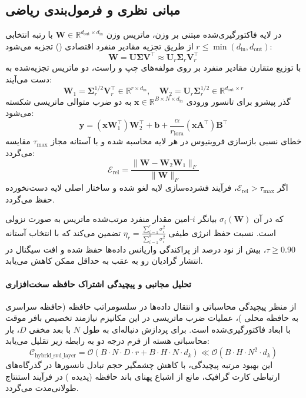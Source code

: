 \subsection{مبانی نظری و فرمول‌بندی ریاضی}
در لایه فاکتورگیری‌شده مبتنی بر وزن، ماتریس وزن $\mathbf{W} \in \mathbb{R}^{d_{\text{out}} \times d_{\text{in}}}$ با رتبه انتخابی $r \le \min(d_{\text{in}}, d_{\text{out}})$ از طریق تجزیه مقادیر منفرد اقتصادی () تجزیه می‌شود:
\begin{equation}
\mathbf{W} = \mathbf{U} \mathbf{\Sigma} \mathbf{V}^\top \approx \mathbf{U}_r \mathbf{\Sigma}_r \mathbf{V}_r^\top
\end{equation}
با توزیع متقارن مقادیر منفرد بر روی مولفه‌های چپ و راست، دو ماتریس تجزیه‌شده به دست می‌آیند:
\begin{equation}
\mathbf{W}_1 = \mathbf{\Sigma}_r^{1/2} \mathbf{V}_r^\top \in \mathbb{R}^{r \times d_{\text{in}}}, \quad \mathbf{W}_2 = \mathbf{U}_r \mathbf{\Sigma}_r^{1/2} \in \mathbb{R}^{d_{\text{out}} \times r}
\end{equation}
گذر پیشرو برای تانسور ورودی $\mathbf{x} \in \mathbb{R}^{B \times N \times d_{\text{in}}}$ به دو ضرب متوالی ماتریسی شکسته می‌شود:
\begin{equation}
\mathbf{y} = (\mathbf{x} \mathbf{W}_1^\top) \mathbf{W}_2^\top + \mathbf{b} + \frac{\alpha}{r_{\text{lora}}} (\mathbf{x} \mathbf{A}^\top) \mathbf{B}^\top
\end{equation}
خطای نسبی بازسازی فروبنیوس در هر لایه محاسبه شده و با آستانه مجاز $\tau_{\text{max}}$ مقایسه می‌گردد:
\begin{equation}
\mathcal{E}_{\text{rel}} = \frac{\|\mathbf{W} - \mathbf{W}_2 \mathbf{W}_1\|_F}{\|\mathbf{W}\|_F}
\end{equation}
اگر $\mathcal{E}_{\text{rel}} > \tau_{\text{max}}$، فرآیند فشرده‌سازی لایه لغو شده و ساختار اصلی لایه دست‌نخورده حفظ می‌گردد.

که در آن $\sigma_i(\mathbf{W})$ بیانگر $i$-امین مقدار منفرد مرتب‌شده ماتریس به صورت نزولی است. نسبت حفظ انرژی طیفی $\eta_r = \frac{\sum_{i=1}^r \sigma_i^2}{\sum_{i=1}^{d} \sigma_i^2}$ تضمین می‌کند که با انتخاب آستانه $\tau \ge 0.90$، بیش از نود درصد از پراکندگی واریانس داده‌ها حفظ شده و افت سیگنال در انتشار گرادیان رو به عقب به حداقل ممکن کاهش می‌یابد.

\paragraph{تحلیل مجانبی و پیچیدگی اشتراک حافظه سخت‌افزاری}
از منظر پیچیدگی محاسباتی و انتقال داده‌ها در سلسومراتب حافظه (حافظه سراسری  به حافظه محلی )، عملیات ضرب ماتریسی در این مکانیزم نیازمند تخصیص بافر موقت با ابعاد فاکتورگیری‌شده است. برای پردازش دنباله‌ای به طول $N$ با بعد مخفی $D$، بار محاسباتی هسته از فرم درجه دو به رابطه زیر تقلیل می‌یابد:
\begin{equation}
\label{eq:complexity_hybrid_svd_layer}
\mathcal{C}_{\text{hybrid\_svd\_layer}} = \mathcal{O}\left( B \cdot N \cdot D \cdot r + B \cdot H \cdot N \cdot d_k \right) \ll \mathcal{O}\left( B \cdot H \cdot N^2 \cdot d_k \right)
\end{equation}
این بهبود مرتبه پیچیدگی، با کاهش چشمگیر حجم تبادل تانسورها در گذرگاه‌های ارتباطی کارت گرافیک، مانع از اشباع پهنای باند حافظه (پدیده ) در فرآیند استنتاج طولانی‌مدت می‌گردد.
